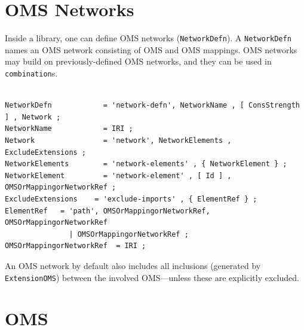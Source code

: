 \documentclass[10pt,fleqn,%
\ifpretendfinal
final%
\else
draft%
\fi,
]{scrreprt}
\newcommand{\red}[1]{#1} %
\newcommand*{\syntax}[1]{\texttt{#1}}
\newcommand{\sclause}[1]{\section{#1}}
\begin{document}
\sclause{OMS Networks}\label{c:networks}
\red{
Inside a library, one can define OMS networks (\syntax{NetworkDefn}).
A \syntax{NetworkDefn} names an
OMS network consisting of  OMS and OMS mappings. OMS networks may build on previously-defined
OMS networks, and they can be used in \syntax{combination}s.  
}
\begin{lstlisting}[language=ebnf,escapeinside={()}]  % abstract syntax

NetworkDefn            = 'network-defn', NetworkName , [ ConsStrength ] , Network ;
NetworkName            = IRI ;
Network                = 'network', NetworkElements , ExcludeExtensions ;
NetworkElements        = 'network-elements' , { NetworkElement } ;
NetworkElement         = 'network-element' , [ Id ] , OMSOrMappingorNetworkRef ;
ExcludeExtensions    = 'exclude-imports' , { ElementRef } ; 
ElementRef   = 'path', OMSOrMappingorNetworkRef, OMSOrMappingorNetworkRef 
               | OMSOrMappingorNetworkRef ;
OMSOrMappingorNetworkRef  = IRI ;
\end{lstlisting}

An OMS network by default also includes all inclusions (generated by
\syntax{ExtensionOMS}) between the involved OMS---unless these are
explicitly excluded.

\sclause{OMS}\label{c:focused-OMS}
\end{document}

